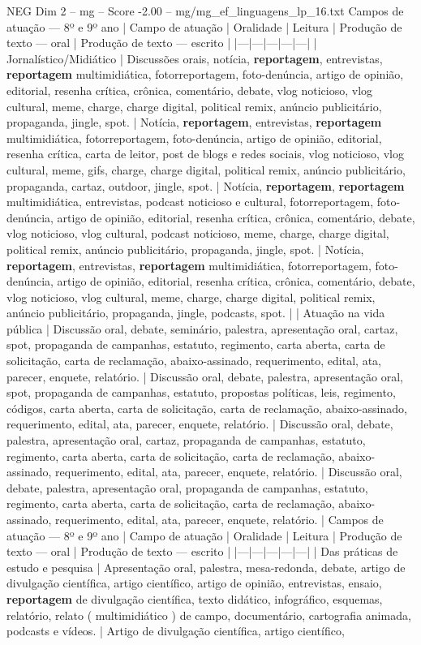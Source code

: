 \begin{textsample}{NEG Dim 2 – mg – Score -2.00 – mg/mg\_ef\_linguagens\_lp\_16.txt}  \label{ex:f2_neg_096}
Campos de atuação — 8º e 9º ano | Campo de atuação | Oralidade | Leitura | Produção de texto — oral | Produção de texto — escrito | |---|---|---|---|---| | Jornalístico/Midiático | Discussões orais, notícia, \textbf{reportagem}, entrevistas, \textbf{reportagem} multimidiática, fotorreportagem, foto-denúncia, artigo de opinião, editorial, resenha crítica, crônica, comentário, debate, vlog noticioso, vlog cultural, meme, charge, charge digital, political remix, anúncio publicitário, propaganda, jingle, spot. | Notícia, \textbf{reportagem}, entrevistas, \textbf{reportagem} multimidiática, fotorreportagem, foto-denúncia, artigo de opinião, editorial, resenha crítica, carta de leitor, post de blogs e redes sociais, vlog noticioso, vlog cultural, meme, gifs, charge, charge digital, political remix, anúncio publicitário, propaganda, cartaz, outdoor, jingle, spot. | Notícia, \textbf{reportagem}, \textbf{reportagem} multimidiática, entrevistas, podcast noticioso e cultural, fotorreportagem, foto-denúncia, artigo de opinião, editorial, resenha crítica, crônica, comentário, debate, vlog noticioso, vlog cultural, podcast noticioso, meme, charge, charge digital, political remix, anúncio publicitário, propaganda, jingle, spot. | Notícia, \textbf{reportagem}, entrevistas, \textbf{reportagem} multimidiática, fotorreportagem, foto-denúncia, artigo de opinião, editorial, resenha crítica, crônica, comentário, debate, vlog noticioso, vlog cultural, meme, charge, charge digital, political remix, anúncio publicitário, propaganda, jingle, podcasts, spot. | | Atuação na vida pública | Discussão oral, debate, seminário, palestra, apresentação oral, cartaz, spot, propaganda de campanhas, estatuto, regimento, carta aberta, carta de solicitação, carta de reclamação, abaixo-assinado, requerimento, edital, ata, parecer, enquete, relatório. | Discussão oral, debate, palestra, apresentação oral, spot, propaganda de campanhas, estatuto, propostas políticas, leis, regimento, códigos, carta aberta, carta de solicitação, carta de reclamação, abaixo-assinado, requerimento, edital, ata, parecer, enquete, relatório. | Discussão oral, debate, palestra, apresentação oral, cartaz, propaganda de campanhas, estatuto, regimento, carta aberta, carta de solicitação, carta de reclamação, abaixo-assinado, requerimento, edital, ata, parecer, enquete, relatório. | Discussão oral, debate, palestra, apresentação oral, propaganda de campanhas, estatuto, regimento, carta aberta, carta de solicitação, carta de reclamação, abaixo-assinado, requerimento, edital, ata, parecer, enquete, relatório. | Campos de atuação — 8º e 9º ano | Campo de atuação | Oralidade | Leitura | Produção de texto — oral | Produção de texto — escrito | |---|---|---|---|---| | Das práticas de estudo e pesquisa | Apresentação oral, palestra, mesa-redonda, debate, artigo de divulgação científica, artigo científico, artigo de opinião, entrevistas, ensaio, \textbf{reportagem} de divulgação científica, texto didático, infográfico, esquemas, relatório, relato ( multimidiático ) de campo, documentário, cartografia animada, podcasts e vídeos. | Artigo de divulgação científica, artigo científico, 
\end{textsample}
